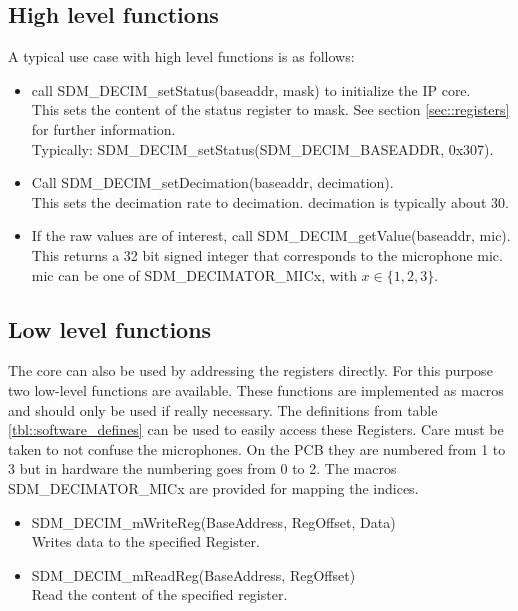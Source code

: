 \subsection{High level functions}
A typical use case with high level functions is as follows:
\begin{itemize}
	\item call SDM\_DECIM\_setStatus(baseaddr, mask) to initialize the IP core. \\
		This sets the content of the status register to mask. See section \ref{sec::registers} for further information.\\
		Typically: SDM\_DECIM\_setStatus(SDM\_DECIM\_BASEADDR, 0x307).
	\item Call SDM\_DECIM\_setDecimation(baseaddr, decimation). \\
		This sets the decimation rate to decimation. decimation is typically about 30.
	\item If the raw values are of interest, call SDM\_DECIM\_getValue(baseaddr, mic).\\
		This returns a 32 bit signed integer that corresponds to the microphone mic. \\
		mic can be one of SDM\_DECIMATOR\_MICx, with $x\in\{1,2,3\}$.
\end{itemize}

\subsection{Low level functions}
The core can also be used by addressing the registers directly.
For this purpose two low-level functions are available.
These functions are implemented as macros and should only be used if really necessary.
The definitions from table \ref{tbl::software_defines} can be used to easily access these Registers.
Care must be taken to not confuse the microphones. 
On the PCB they are numbered from 1 to 3 but in hardware the numbering goes from 0 to 2.
The macros SDM\_DECIMATOR\_MICx are provided for mapping the indices.

\begin{itemize}
	\item SDM\_DECIM\_mWriteReg(BaseAddress, RegOffset, Data) \\
		Writes data to the specified Register. 
	\item SDM\_DECIM\_mReadReg(BaseAddress, RegOffset) \\		
		Read the content of the specified register.
\end{itemize}

